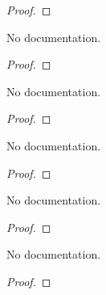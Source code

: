 \begin{proof}
    \leanok
\end{proof}

\begin{theorem}\label{ValAlgebra.val_map_lt_iff}
        \leanok
                No documentation.
    \end{theorem}

\begin{proof}
    \leanok
\end{proof}

\begin{theorem}\label{ValAlgebra.val_map_le_one_iff}
        \leanok
                No documentation.
    \end{theorem}

\begin{proof}
    \leanok
\end{proof}

\begin{theorem}\label{ValAlgebra.val_map_lt_one_iff}
        \leanok
                No documentation.
    \end{theorem}

\begin{proof}
    \leanok
\end{proof}

\begin{theorem}\label{val_map_inv_le_val_iff}
        \leanok
                No documentation.
    \end{theorem}

\begin{proof}
    \leanok
\end{proof}

\begin{theorem}\label{val_le_val_map_inv_iff}
        \leanok
                No documentation.
    \end{theorem}

\begin{proof}
    \leanok
\end{proof}

